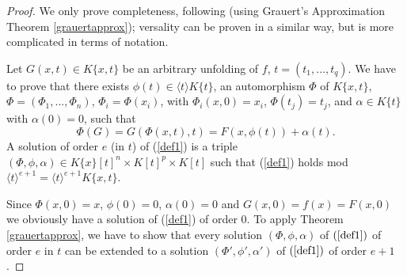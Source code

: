 \documentclass[11pt]{article}
\begin{document}
 \begin{proof}
We only prove completeness, following \cite{GP25a} (using Grauert's Approximation Theorem \ref{grauertapprox}); versality can be proven in a similar way, but is more complicated in terms of notation.

 Let $G(x,t)\in K\{x,t\} $ be an arbitrary unfolding of $f$, $t=(t_1,\ldots,t_q)$.
 We have to prove that there exists $\phi(t)\in \langle t\rangle K\{t\}$, an automorphism  $\Phi$ of $K\{x,t\}$, $\Phi = (\Phi_1,...,\Phi_n)$, $\Phi_i = \Phi(x_i)$,
with $\Phi_i(x,0) = x_i$,
$\Phi(t_j) = t_j$, and $\alpha \in K\{t\}$ with  $\alpha(0)=0$,
such that
\begin{equation}\label{def1}
\Phi(G)=G(\Phi(x,t),t) = F(x,\phi(t)) +\alpha(t).
\end{equation}
A solution of order $e$ (in $t$) of (\ref{def1}) is a triple $(\Phi,\phi,\alpha) \in K\{x\}[t]^n \times K[t]^p  \times K[t]$  such that 
(\ref{def1}) holds mod $\langle t \rangle^{e+1}= \langle t \rangle^{e+1}K\{x,t\}$.

Since $\Phi(x,0) =x$, $\phi(0)= 0$, $\alpha(0)=0$  and $G(x,0)=f(x)=F(x,0)$ we obviously have a solution of (\ref{def1}) of order $0$. 
To apply Theorem \ref{grauertapprox}, we have to show that every solution 
$(\Phi,\phi,\alpha)$ of $(\ref{def1})$ of order $e$ in $t$ can be extended to a solution
$(\Phi',\phi',\alpha')$ of $(\ref{def1})$ of order $e+1$. 


\end{proof}
\end{document}
